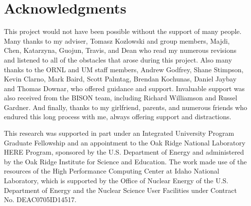 \documentclass[edeposit,fullpage,11pt]{uiucthesis2009}
\begin{document}

\chapter*{Acknowledgments}

This project would not have been possible without the support of many people. 
Many thanks to my adviser, Tomasz Kozlowski and group members, Majdi, Chen, Katarzyna, Guojun, Travis, and Dean who read my numerous revisions and listened to all of the obstacles that arose during this project.
Also many thanks to the ORNL and UM staff members, Andrew Godfrey, Shane Stimpson, Kevin Clarno, Mark Baird, Scott Palmtag, Brendan Kochunas, Daniel Jaybay and Thomas Downar, who offered guidance and support.
Invaluable support was also received from the BISON team, including Richard Williamson and Russel Gardner.
And finally, thanks to my girlfriend, parents, and numerous friends who endured this long process with me, always offering support and distractions.

This research was supported in part under an Integrated University Program Graduate Fellowship and an appointment to the Oak Ridge National Laboratory HERE Program, sponsored by the U.S. Department of Energy and administered by the Oak Ridge Institute for Science and Education.
The work made use of the resources of the High Performance Computing Center at Idaho National Laboratory, which is supported by the Office of Nuclear Energy of the U.S. Department of Energy and the Nuclear Science User Facilities under Contract No. DE­AC07­05ID14517.

\end{document}
